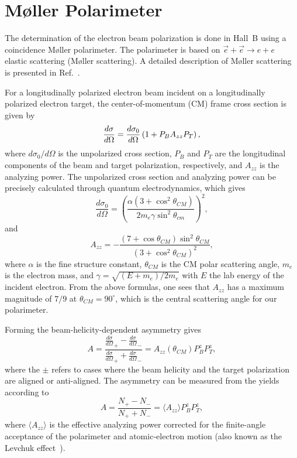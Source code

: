 \section{M{\o}ller Polarimeter}
\label{mollerpol}

The determination of the electron beam polarization is done in Hall~B using a coincidence M{\o}ller polarimeter.
The polarimeter is based on ${\vec e} + {\vec e} \to e + e$  elastic scattering (M{\o}ller scattering). A detailed
description of M{\o}ller scattering is presented in Ref.~\cite{Wagner:1990sn}.  

For a longitudinally polarized electron beam incident on a longitudinally polarized electron target, the 
center-of-momentum (CM) frame cross section is given by~\cite{moller32,kresnin57}
\begin{equation}
\label{eq-csec}
 {{d\sigma}\over{d\Omega}}=
  {{d\sigma_0}\over{d\Omega}}\left(1+P_BA_{zz}P_T\right),
\end{equation}
where $d\sigma_0/d\Omega$ is the unpolarized cross section, $P_B$ and $P_T$ are the longitudinal components
of the beam and target polarization, respectively, and $A_{zz}$ is the analyzing power. The unpolarized cross section
and analyzing power can be precisely calculated through quantum electrodynamics, which gives
%
\begin{equation}
\label{eq-csecCM}
	\frac{d\sigma_0}{d\Omega}=\left(\frac{\alpha\left(3+\cos^2\theta_{CM}\right)}
						{2m_e\gamma\sin^2\theta_{cm}}\right)^2,
\end{equation}
%
and 
\begin{equation}
\label{eq-Azz}
	A_{zz}=-\frac{\left(7+\cos\theta_{CM}\right)\sin^2\theta_{CM}}{\left(3+\cos^2\theta_{CM}\right)^2},
\end{equation}
%
where $\alpha$ is the fine structure constant, $\theta_{CM}$ is the CM polar scattering angle, $m_e$ is the
electron mass, and $\gamma=\sqrt{\left(E+m_e\right)/2m_e}$ with $E$ the lab energy of the incident
electron. From the above formulas, one sees that $A_{zz}$ has a maximum magnitude of $7/9$ at
$\theta_{CM}=90^\circ$, which is the central scattering angle for our polarimeter.

Forming the beam-helicity-dependent asymmetry gives
\begin{equation}
\label{eq-asymm}
A=\frac{\frac{d\sigma}{d\Omega}_+-\frac{d\sigma}{d\Omega}_-}{\frac{d\sigma}{d\Omega}_+
  +\frac{d\sigma}{d\Omega}_-}
	=A_{zz}\left(\theta_{CM}\right)P_B^zP_T^z,
\end{equation}
where the $\pm$ refers to cases where the beam helicity and the target polarization are aligned or anti-aligned.
The asymmetry can be measured from the yields according to
%
\begin{equation}
\label{eq-asymm-meas}
	A=\frac{N_+-N_-}{N_++N_-}=\langle A_{zz}\rangle P_B^zP_T^z,
\end{equation}
%
where $\langle A_{zz}\rangle$ is the effective analyzing power corrected for the finite-angle acceptance of the
polarimeter and atomic-electron motion (also known as the Levchuk effect~\cite{levchuk94}).

